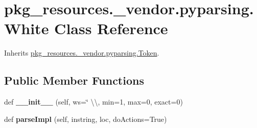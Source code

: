 \hypertarget{classpkg__resources_1_1__vendor_1_1pyparsing_1_1_white}{}\section{pkg\+\_\+resources.\+\_\+vendor.\+pyparsing.\+White Class Reference}
\label{classpkg__resources_1_1__vendor_1_1pyparsing_1_1_white}


Inherits \hyperlink{classpkg__resources_1_1__vendor_1_1pyparsing_1_1_token}{pkg\+\_\+resources.\+\_\+vendor.\+pyparsing.\+Token}.

\subsection*{Public Member Functions}
\begin{DoxyCompactItemize}
\item 
\mbox{\label{classpkg__resources_1_1__vendor_1_1pyparsing_1_1_white_a792c04c5fbca98c7c1ec77d9713eb7fa}} 
def {\bfseries \+\_\+\+\_\+init\+\_\+\+\_\+} (self, ws=\char`\"{} \textbackslash{}\textbackslash{}, min=1, max=0, exact=0)
\item 
\mbox{\label{classpkg__resources_1_1__vendor_1_1pyparsing_1_1_white_a5e6ed35a8adef6f1520a354a1a2b2832}} 
def {\bfseries parse\+Impl} (self, instring, loc, do\+Actions=True)
\end{DoxyCompactItemize}

